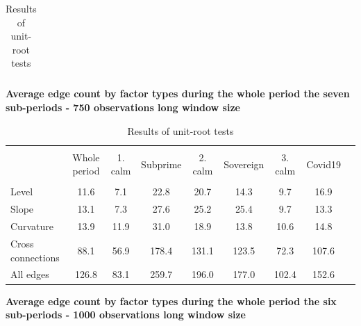 \documentclass[12pt,bibliography=totoc]{article}
\begin{document}
\begin{table}[H]
\begin{subtable}[t]{1\textwidth}
\begin{tabular}{l  cccccccc}

\hline            
\end{tabular}
\caption{\textbf{Average edge count by factor types during the whole period the seven sub-periods - 750 observations long window size}} %
\end{subtable}
\hspace{\fill}
\bigskip


\begin{subtable}[t]{1\textwidth}
\centering%
\begin{tabular}{l  cccccccc}%
\hline\hline \\ [-1.5ex]                         %


				& Whole period &1. calm  & Subprime & 2. calm &Sovereign & 3. calm & Covid19 \\
\hline \\ [-1.5ex]  
Level				&11.6	&7.1		&22.8	&20.7	&14.3		&9.7		&16.9   \\
Slope					&13.1	&7.3		&27.6	&25.2	&25.4		&9.7		&13.3   \\
Curvature					&13.9	&11.9		&31.0	&18.9	&13.8		&10.6		&14.8   \\
Cross connections			&88.1	&56.9		&178.4	&131.1	&123.5		&72.3		&107.6  \\
All edges					&126.8	&83.1		&259.7	&196.0	&177.0		&102.4		&152.6  \\


\hline            
\end{tabular}
\caption{\textbf{Average edge count by factor types during the whole period the six sub-periods - 1000 observations long window size}}
\end{subtable}
\hspace{\fill}

\caption{Results of unit-root tests}
\label{tab:differentWindowSizes}
\end{table}
\end{document}

